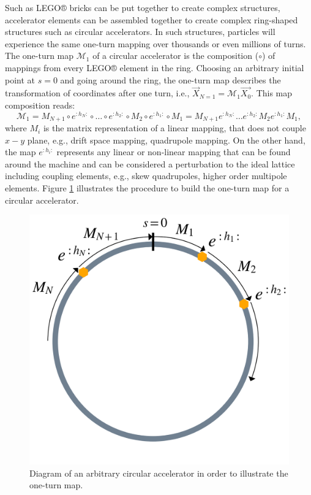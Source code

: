 Such as LEGO® bricks can be put together to create complex structures, accelerator elements can be assembled together to create complex ring-shaped structures such as circular accelerators. In such structures, particles will experience the same one-turn mapping over thousands or even millions of turns. The one-turn map $\mathcal{M}_1$ of a circular accelerator is the composition ($\circ$) of mappings from every LEGO® element in the ring. Choosing an arbitrary initial point at $s=0$ and going around the ring, the one-turn map describes the transformation of coordinates after one turn, i.e., $\vec{X}_{N=1}=\mathcal{M}_1 \vec{X_0}$. This map composition reads:
\begin{equation}
    \label{eq:oneturnmap}
    \mathcal{M}_1=M_{N+1} \circ e^{:h_N:} \circ \dots \circ e^{:h_2:} \circ M_2 \circ e^{:h_1:} \circ M_1 = M_{N+1}e^{:h_N:} \dots e^{:h_2:}M_2 e^{:h_1:}M_1,
\end{equation}
where $M_i$ is the matrix representation of a linear mapping, that does not couple $x-y$ plane, e.g., drift space mapping, quadrupole mapping. On the other hand, the map $e^{:h_i:}$ represents any linear or non-linear mapping that can be found around the machine and can be considered a perturbation to the ideal lattice including coupling elements, e.g., skew quadrupoles, higher order multipole elements. Figure \ref{fig:oneturn} illustrates the procedure to build the one-turn map for a circular accelerator. 

\begin{figure}[H]
    \centering
    \includegraphics[width=0.7\columnwidth]{chapter2/oneturn.png}
    \caption{Diagram of an arbitrary circular accelerator in order to illustrate the one-turn map.}
    \label{fig:oneturn}
 \end{figure}

